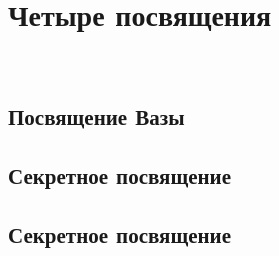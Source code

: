 \section{Четыре посвящения}
\\
\subsection*{Посвящение Вазы}
\subsection*{Секретное посвящение}
\subsection*{Секретное посвящение}

